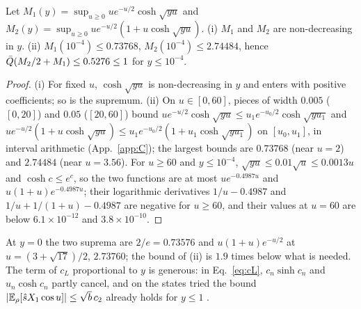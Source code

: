 \begin{lemma} 
\label{lem:M12}
Let $M_1(y)=\sup_{u\ge0}ue^{-u/2}\cosh\sqrt{yu}$ and $M_2(y)=\sup_{u\ge0}ue^{-u/2}(1+u\cosh\sqrt{yu})$.
(i) $M_1$ and $M_2$ are non-decreasing in $y$.
(ii) $M_1(10^{-4})\le0.73768$, $M_2(10^{-4})\le2.74484$, hence $\bar Q(M_2/2+M_1)\le0.5276\le1$ for $y\le10^{-4}$.
\end{lemma}
\begin{proof}
(i) For fixed $u$, $\cosh\sqrt{yu}$ is non-decreasing in $y$ and enters with positive coefficients; so is the supremum.
(ii) On $u\in[0,60]$, pieces of width $0.005$ ($[0,20]$) and $0.05$ ($[20,60]$) bound $ue^{-u/2}\cosh\sqrt{yu}\le u_1e^{-u_0/2}\cosh\sqrt{yu_1}$ and $ue^{-u/2}(1+u\cosh\sqrt{yu})\le u_1e^{-u_0/2}(1+u_1\cosh\sqrt{yu_1})$ on $[u_0,u_1]$, in interval arithmetic (App.~\ref{app:C}); the largest bounds are $0.73768$ (near $u=2$) and $2.74484$ (near $u=3.56$).
For $u\ge60$ and $y\le10^{-4}$, $\sqrt{yu}\le0.01\sqrt u\le0.0013u$ and $\cosh c\le e^c$, so the two functions are at most $ue^{-0.4987u}$ and $u(1+u)e^{-0.4987u}$; their logarithmic derivatives $1/u-0.4987$ and $1/u+1/(1+u)-0.4987$ are negative for $u\ge60$, and their values at $u=60$ are below $6.1\times10^{-12}$ and $3.8\times10^{-10}$.
\end{proof}
At $y=0$ the two suprema are $2/e=0.73576$ and $u(1+u)e^{-u/2}$ at $u=(3+\sqrt{17})/2$, $2.73760$; the bound of (ii) is $1.9$ times below what is needed.
The term of $c_L$ proportional to $y$ is generous: in Eq.~\eqref{eq:cL}, $c_n\sinh c_n$ and $u_n\cosh c_n$ partly cancel, and on the states tried the bound $|\mathbb{E}_\rho[\hat sX_1\cos u]|\le\sqrt b\,c_2$ already holds for $y\le1$ \numst.

